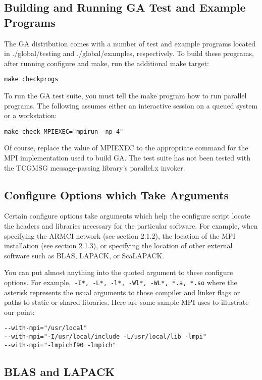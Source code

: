 \subsection{Building and Running GA Test and Example Programs}

The GA distribution comes with a number of test and example programs located in
./global/testing and ./global/examples, respectively. To build these programs,
after running configure and make, run the additional make target: 
\begin{verbatim}
make checkprogs
\end{verbatim}
To run the GA test suite, you must tell the make program how to run parallel
programs. The following assumes either an interactive session on a queued
system or a workstation: 
\begin{verbatim}
make check MPIEXEC="mpirun -np 4"
\end{verbatim}
Of course, replace the value of MPIEXEC to the appropriate command for the MPI
implementation used to build GA. The test suite has not been tested with the
TCGMSG message-passing library's parallel.x invoker. 

\subsection{Configure Options which Take Arguments}

Certain configure options take arguments which help the configure script locate
the headers and libraries necessary for the particular software. For example,
when specifying the ARMCI network (see section 2.1.2), the location of the MPI
installation (see section 2.1.3), or specifying the location of other external
software such as BLAS, LAPACK, or ScaLAPACK. 

You can put almost anything into the quoted argument to these configure
options. For example,\texttt{ -I{*}, -L{*}, -l{*}, -Wl{*}, -WL{*}, {*}.a,
{*}.so} where the asterisk represents the usual arguments to those compiler and
linker flags or paths to static or shared libraries.  Here are some sample MPI
uses to illustrate our point:
\begin{verbatim}
--with-mpi="/usr/local"
--with-mpi="-I/usr/local/include -L/usr/local/lib -lmpi"
--with-mpi="-lmpichf90 -lmpich"
\end{verbatim}

\subsection{BLAS and LAPACK}

